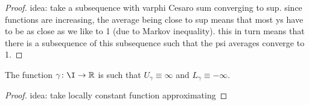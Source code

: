 \documentclass[b5paper]{memoir}
\begin{document}
\begin{proof}
  idea: take a subsequence with varphi Cesaro sum converging to sup. since functions are increasing, the average being close to sup means that most ys have to be as close as we like to 1 (due to Markov inequality). this in turn means that there is a subsequence of this subsequence such that the psi averages converge to 1.

\end{proof}

\begin{lemma}
  The function \(\gamma \colon \I \to \mathbb{R}\) is such that \(U_{\gamma} \equiv \infty\) and \(L_{\gamma} \equiv - \infty\).
\end{lemma}
\begin{proof}
  idea: take locally constant function approximating
\end{proof}
\end{document}
